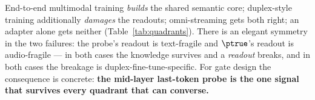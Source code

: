 End-to-end multimodal training \emph{builds} the shared semantic core;
duplex-style training additionally \emph{damages} the readouts;
omni-streaming gets both right; an adapter alone gets neither
(Table~\ref{tab:quadrants}). There is an elegant symmetry in the two
failures: the probe's readout is text-fragile and $\ptrue$'s readout is
audio-fragile --- in both cases the knowledge survives and a \emph{readout}
breaks, and in both cases the breakage is duplex-fine-tune-specific. For
gate design the consequence is concrete: \textbf{the mid-layer last-token
probe is the one signal that survives every quadrant that can converse.}
